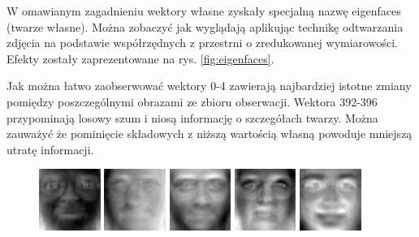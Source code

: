 \documentclass{article}
\begin{document}
W omawianym zagadnieniu wektory własne zyskały specjalną nazwę eigenfaces (twarze własne). Można zobaczyć jak wyglądają aplikując technikę odtwarzania zdjęcia na podstawie współrzędnych z przestrni o zredukowanej wymiarowości. Efekty zostały zaprezentowane na rys. \ref{fig:eigenfaces}. 

Jak można łatwo zaobserwować wektory 0-4 zawierają najbardziej istotne zmiany pomiędzy poszczególnymi obrazami ze zbioru obserwacji. Wektora 392-396 przypominają losowy szum i niosą informację o szczegółach twarzy. Można zauważyć że pominięcie składowych z niższą wartością własną powoduje mniejszą utratę informacji.


\begin{figure}
\centering
	\parbox{2cm}{
		\includegraphics[width=2cm]{0.jpg}
		}
	\begin{minipage}{2cm}
		\includegraphics[width=2cm]{1.jpg}
	\end{minipage}
	\begin{minipage}{2cm}
		\includegraphics[width=2cm]{2.jpg}
	\end{minipage}
	\begin{minipage}{2cm}
		\includegraphics[width=2cm]{3.jpg}
	\end{minipage}
	\begin{minipage}{2cm}
		\includegraphics[width=2cm]{4.jpg}
	\end{minipage}\\
	

\end{figure}
\end{document}
